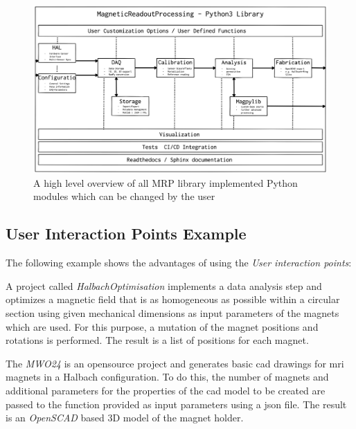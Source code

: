 \begin{figure}
\centering
\includegraphics{./generated_images/border_A_high_level_overview_of_all_MRP_library_implemented_Python_modules_which_can_be_changed_by_the_user.png}
\caption{A high level overview of all MRP library implemented Python
modules which can be changed by the user
\label{A_high_level_overview_of_all_MRP_library_implemented_Python_modules_which_can_be_changed_by_the_user.png}}
\end{figure}

\hypertarget{user-interaction-points-example}{%
\subsection{User Interaction Points
Example}\label{user-interaction-points-example}}

The following example shows the advantages of using the \emph{User
interaction points}:

A project called \emph{HalbachOptimisation}  implements a
data analysis step and optimizes a magnetic field that is as homogeneous
as possible within a circular section using given mechanical dimensions
as input parameters of the magnets which are used. For this purpose, a
mutation of the magnet positions and rotations is performed. The result
is a list of positions for each magnet.

The \emph{MWO24}  is an opensource project and generates
basic \gls{cad} drawings for \gls{mri} magnets in a Halbach
configuration. To do this, the number of magnets and additional
parameters for the properties of the \gls{cad} model to be created are
passed to the function provided as input parameters using a \gls{json}
file. The result is an \emph{OpenSCAD}  based 3D model
of the magnet holder.

